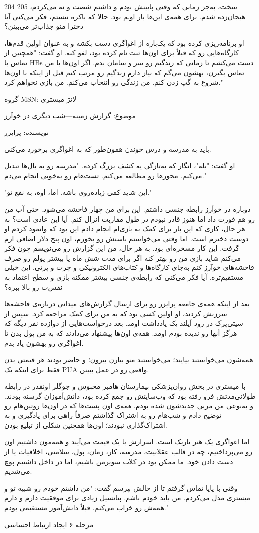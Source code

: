 204 205
سخت، به‌جز زمانی که وقتی پایینش بودم و داشتم شصت و نه می‌کردم، هیجان‌زده شدم. برای همه‌ی این‌ها بار اولم بود. حالا که باکره نیستم، فکر می‌کنی آیا دخترا منو جذاب‌تر می‌بینن؟

او برنامه‌ریزی کرده بود که یک‌باره از اغواگری دست بکشه و به عنوان اولین قدم‌ها، کارگاه‌هایی رو که قبلاً برای اون‌ها ثبت نام کرده بود، لغو کنه. او گفت: "همچنین از تماس با HBs دست می‌کشم تا زمانی که زندگیم رو سر و سامان بدم. اگر اون‌ها با من تماس بگیرن، بهشون می‌گم که نیاز دارم زندگیم رو مرتب کنم قبل از اینکه با اون‌ها شروع به گپ زدن کنم. من زندگی رو انتخاب می‌کنم. من بازی نخواهم کرد."

گروه MSN: لانژ میستری

موضوع: گزارش زمینه—شب دیگری در خوآرز

نویسنده: پرایزر

باید به مدرسه و درس خوندن همون‌طور که به اغواگری برخورد می‌کنی.

او گفت: "بله"، انگار که به‌تازگی یه کشف بزرگ کرده. "مدرسه رو به بال‌ها تبدیل می‌کنم. محورها رو مطالعه می‌کنم. تست‌هام رو به‌خوبی انجام می‌دم."

"این شاید کمی زیاده‌روی باشه. اما، اوه، به نفع تو."

دوباره در خوآرز رابطه جنسی داشتم. این برای من چهار فاحشه می‌شود. حتی آب من رو هم قورت داد اما هنوز قادر نبودم در طول مقاربت انزال کنم. آیا این عادی است؟ به هر حال، کاری که این بار برای کمک به بازی‌ام انجام دادم این بود که وانمود کردم او دوست دخترم است. اما وقتی می‌خواستم باسنش رو بخورم، اون پنج دلار اضافی ازم گرفت. این کار مسخره‌ای بود. به هر حال، من این گزارش رو می‌نویسم چون فکر می‌کنم شاید بازی من رو بهتر کنه اگر برای مدت شش ماه یا بیشتر پولم رو صرف فاحشه‌های خوآرز کنم به‌جای کارگاه‌ها و کتاب‌های الکترونیکی و چرت و پرتی. این خیلی مستقیم‌تره. آیا فکر می‌کنی که رابطه‌ی جنسی بیشتر ممکنه بازی و سطح اعتماد به نفس‌ت رو بالا ببره؟

بعد از اینکه همه‌ی جامعه پرایزر رو برای ارسال گزارش‌های میدانی درباره‌ی فاحشه‌ها سرزنش کردند، او اولین کسی بود که به من برای کمک مراجعه کرد. سپس از سیتی‌پرک در رود آیلند یک یادداشت اومد. بعد درخواست‌هایی از دوازده نفر دیگه که هرگز آنها رو ندیده بودم اومد. همه‌ی اون‌ها پیشنهاد می‌دادند که به من پول بدن تا اغواگری رو بهشون یاد بدم.

همه‌شون می‌خواستند بیایند؛ می‌خواستند منو بیارن بیرون؛ و حاضر بودند هر قیمتی بدن فقط برای اینکه یک PUA واقعی رو در عمل ببینن.

با میستری در بخش روان‌پزشکی بیمارستان هامبر محبوس و جوگلر اونقدر در رابطه طولانی‌مدتش فرو رفته بود که وب‌سایتش رو جمع کرده بود، دانش‌آموزان گرسنه بودند. و به‌نوعی من مربی جدیدشون شده بودم. همه‌ی اون پست‌ها که در اون‌ها روتین‌هام رو توضیح دادم و شب‌هام رو به اشتراک گذاشتم صرفاً راهی برای یادگیری و به اشتراک‌گذاری نبودند؛ اون‌ها همچنین شکلی از تبلیغ بودن.

اما اغواگری یک هنر تاریک است. اسرارش با یک قیمت می‌آیند و همه‌مون داشتیم اون رو می‌پرداختیم، چه در قالب عقلانیت، مدرسه، کار، زمان، پول، سلامتی، اخلاقیات یا از دست دادن خود. ما ممکن بود در کلاب سوپرمن باشیم، اما در داخل داشتیم پوچ می‌شدیم.

وقتی با پاپا تماس گرفتم تا از حالش بپرسم گفت: "من داشتم خودم رو شبیه تو و میستری مدل می‌کردم. من باید خودم باشم. پتانسیل زیادی برای موفقیت دارم و دارم همه‌ش رو خراب می‌کنم. قبلاً دانش‌آموز مستقیمی بودم."

مرحله ۶
ایجاد ارتباط احساسی